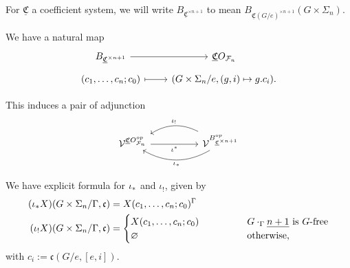 \documentclass[a4paper,10pt
,draft
]{article}%
\newcommand{\UC}{\underline{\mathfrak C}}
\renewcommand{\F}{\mathcal F}
\renewcommand{\1}{\ensuremath{\mathbb{id}}}
\begin{document}
\begin{notation}
      For $\UC$ a coefficient system, we will write $B_{\UC^{\times n+1}}$ to mean
      $B_{\UC(G/e)^{\times n+1}}(G \times \Sigma_n)$.
\end{notation}

We have a natural map
\begin{equation}
      \begin{tikzcd}[row sep = tiny]
            B_{\UC^{\times n+1}} \arrow[r]
            &
            \UC O_{\F_n}
            \\
            (c_1,\dots,c_n;c_0) \arrow[r, mapsto]
            &
            (G \times \Sigma_n/e, (g,i) \mapsto g.c_i).
      \end{tikzcd}
\end{equation}

This induces a pair of adjunction
\begin{equation}
      \begin{tikzcd}[column sep =5em]
            \V^{\UC O_{\F_n}^{op}} \arrow[r, "\iota^{\**}"']
            &
            \V^{B_{\UC^{\times n+1}}^{op}}
            \arrow[l, bend right, "\iota_{!}"']
            \arrow[l, bend left, "\iota_{\**}"]
      \end{tikzcd}
\end{equation}

We have explicit formula for $\iota_{\**}$ and $\iota_!$, given by
\begin{align*}
  (\iota_{\**} X)(G \times \Sigma_n/\Gamma, \mathfrak c) &= X(c_1,\dots, c_n;c_0)^\Gamma\\
  (\iota_! X)(G \times \Sigma_n/\Gamma, \mathfrak c) &=
                                                       {\begin{cases}
                                                               X(c_1,\dots,c_n;c_0) \qquad \qquad & G \cdot_\Gamma \underline{n+1} \mbox{ is $G$-free} \\
                                                               \varnothing & \mbox{otherwise,}
                                                       \end{cases}}
\end{align*}
with  $c_i := \mathfrak c(G/e, [e, i])$.
\end{document}
